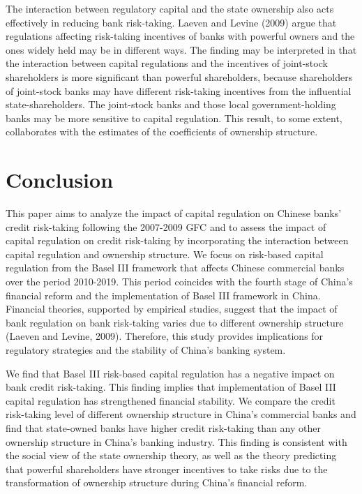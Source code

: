 \documentclass[
  12pt,
  a4paper,
]{scrreprt}
\begin{document}
{{{{The interaction between regulatory capital and the state ownership also
acts effectively in reducing bank risk-taking. Laeven and Levine (2009)
argue that regulations affecting risk-taking incentives of banks with
powerful owners and the ones widely held may be in different ways. The
finding may be interpreted in that the interaction between capital
regulations and the incentives of joint-stock shareholders is more
significant than powerful shareholders, because shareholders of
joint-stock banks may have different risk-taking incentives from the
influential state-shareholders. The joint-stock banks and those local
government-holding banks may be more sensitive to capital regulation.
This result, to some extent, collaborates with the estimates of the
coefficients of ownership structure.

\section{Conclusion}\label{conclusion-1}

This paper aims to analyze the impact of capital regulation on Chinese
banks' credit risk-taking following the 2007-2009 GFC and to assess the
impact of capital regulation on credit risk-taking by incorporating the
interaction between capital regulation and ownership structure. We focus
on risk-based capital regulation from the Basel III framework that
affects Chinese commercial banks over the period 2010-2019. This period
coincides with the fourth stage of China's financial reform and the
implementation of Basel III framework in China. Financial theories,
supported by empirical studies, suggest that the impact of bank
regulation on bank risk-taking varies due to different ownership
structure (Laeven and Levine, 2009). Therefore, this study provides
implications for regulatory strategies and the stability of China's
banking system.

We find that Basel III risk-based capital regulation has a negative
impact on bank credit risk-taking. This finding implies that
implementation of Basel III capital regulation has strengthened
financial stability. We compare the credit risk-taking level of
different ownership structure in China's commercial banks and find that
state-owned banks have higher credit risk-taking than any other
ownership structure in China's banking industry. This finding is
consistent with the social view of the state ownership theory, as well
as the theory predicting that powerful shareholders have stronger
incentives to take risks due to the transformation of ownership
structure during China's financial reform.

}}}}
\end{document}
